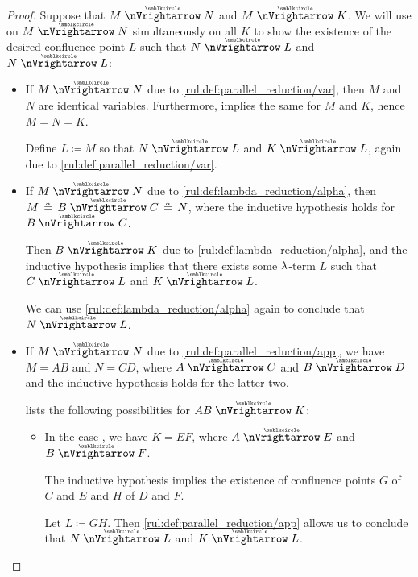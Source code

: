 \begin{proof}
   Suppose that \( M \ppred N \) and \( M \ppred K \). We will use  on \( M \ppred N \) simultaneously on all \( K \) to show the existence of the desired confluence point \( L \) such that \( N \ppred L \) and \( N \ppred L \):
  \begin{itemize}
    \item If \( M \ppred N \) due to \ref{rul:def:parallel_reduction/var}, then \( M \) and \( N \) are identical variables. Furthermore,  implies the same for \( M \) and \( K \), hence \( M = N = K \).

    Define \( L \coloneqq M \) so that \( N \ppred L \) and \( K \ppred L \), again due to \ref{rul:def:parallel_reduction/var}.

    \item If \( M \ppred N \) due to \ref{rul:def:lambda_reduction/alpha}, then \( M \aequiv B \ppred C \aequiv N \), where the inductive hypothesis holds for \( B \ppred C \).

    Then \( B \ppred K \) due to \ref{rul:def:lambda_reduction/alpha}, and the inductive hypothesis implies that there exists some \( \mathrm{\lambda} \)-term \( L \) such that \( C \ppred L \) and \( K \ppred L \).

    We can use \ref{rul:def:lambda_reduction/alpha} again to conclude that \( N \ppred L \).

    \item If \( M \ppred N \) due to \ref{rul:def:parallel_reduction/app}, we have \( M = AB \) and \( N = CD \), where \( A \ppred C \) and \( B \ppred D \) and the inductive hypothesis holds for the latter two.

     lists the following possibilities for \( AB \ppred K \):
    \begin{itemize}
      \item In the case , we have \( K = EF \), where \( A \ppred E \) and \( B \ppred F \).

      The inductive hypothesis implies the existence of confluence points \( G \) of \( C \) and \( E \) and \( H \) of \( D \) and \( F \).

      Let \( L \coloneqq GH \). Then \ref{rul:def:parallel_reduction/app} allows us to conclude that \( N \ppred L \) and \( K \ppred L \).


\end{itemize}
\end{itemize}
\end{proof}
